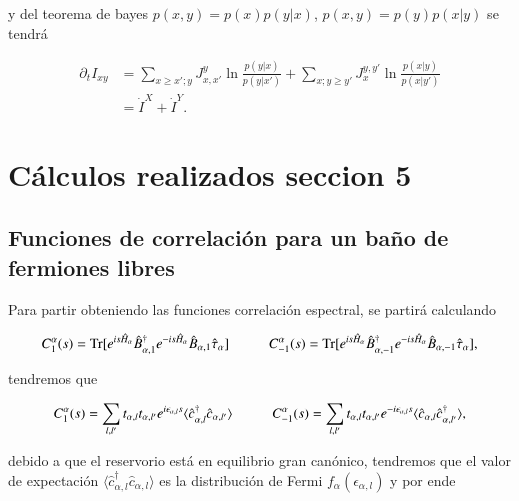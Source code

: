 \begin{appendixs}
y del teorema de bayes $p(x,y) = p(x)p(y|x)$, $p(x,y) = p(y)p(x|y)$ se tendrá

\begin{align*}
    \partial_{t}I_{xy} & = \sum_{x \geq x';y} J_{x,x'}^{y} \ln \frac{p(y|x) }{p(y|x')} + \sum_{x;y\geq y'} J_{x}^{y,y'} \ln \frac{p(x|y) }{p(x|y')} \\
                       & = \dot{I}^{X} + \dot{I}^{Y}. 
\end{align*}

    \label{apendix4:secondlaw}


\newpage

\section{Cálculos realizados seccion 5}
\subsection{Funciones de correlación para un baño de fermiones libres}
Para partir obteniendo las funciones correlación espectral, se partirá calculando

\begin{equation*}
    C_{1}^{\alpha}(s) = \text{Tr}[e^{is\hat{H}_{\alpha}}\hat{B}^{\dagger}_{\alpha,1}e^{-is\hat{H}_{\alpha}}\hat{B}_{\alpha,1}\hat{\tau}_{\alpha}  ]  \hspace{10mm} C_{-1}^{\alpha}(s) = \text{Tr}[e^{is\hat{H}_{\alpha}}\hat{B}^{\dagger}_{\alpha,-1}e^{-is\hat{H}_{\alpha}}\hat{B}_{\alpha,-1}\hat{\tau}_{\alpha}  ], 
\end{equation*}

tendremos que

\begin{equation*}
    C_{1}^{\alpha}(s) = \sum_{l,l'}t_{\alpha,l}t_{\alpha,l'}e^{i\epsilon_{\alpha,l}s} \langle \hat{c}^{\dagger}_{\alpha,l}\hat{c}_{\alpha,l'} \rangle \hspace{10mm} C
    ^{\alpha}_{-1}(s) = \sum_{l,l'}t_{\alpha,l}t_{\alpha,l'}e^{-i\epsilon_{\alpha,l}s} \langle \hat{c}_{\alpha,l}\hat{c}^{\dagger}_{\alpha,l'} \rangle,
\end{equation*}

debido a que el reservorio está en equilibrio gran canónico, tendremos que el valor de expectación $\langle \hat{c}^{\dagger}_{\alpha,l}\hat{c}_{\alpha,l}\rangle$ es la distribución de Fermi $f_{\alpha}(\epsilon_{\alpha,l})$ y por ende  


\end{appendixs}
